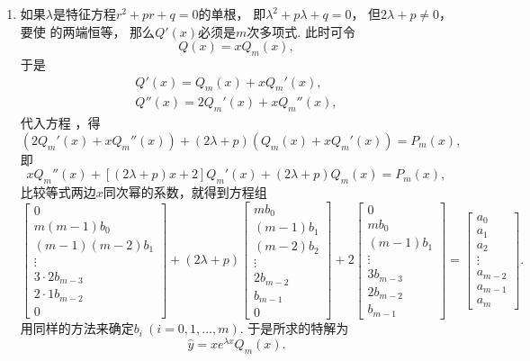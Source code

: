 \begin{enumerate}
	\item 如果\(\lambda\)是特征方程\(r^2+pr+q=0\)的单根，
	即\(\lambda^2+p\lambda+q=0\)，
	但\(2\lambda+p\neq0\)，
	要使  的两端恒等，
	那么\(Q'(x)\)必须是\(m\)次多项式.
	此时可令\[
		Q(x) = x Q_m(x),
	\]
	于是\begin{gather*}
		Q'(x) = Q_m(x) + x Q_m'(x), \\
		Q''(x) = 2 Q_m'(x) + x Q_m''(x),
	\end{gather*}
	代入方程 ，得\[
		(2 Q_m'(x) + x Q_m''(x))
		+ (2\lambda+p) (Q_m(x) + x Q_m'(x))
		= P_m(x),
	\]
	即\[
		x Q_m''(x) + [(2\lambda+p)x+2] Q_m'(x)
		+ (2\lambda+p) Q_m(x)
		= P_m(x),
	\]
	比较等式两边\(x\)同次幂的系数，就得到方程组\[
		\begin{bmatrix}
			0 \\ m(m-1) b_0 \\ (m-1)(m-2) b_1 \\ \vdots \\
			3\cdot2 b_{m-3} \\ 2\cdot1 b_{m-2} \\ 0
		\end{bmatrix}
		+ (2\lambda+p)
		\begin{bmatrix}
			m b_0 \\ (m-1) b_1 \\ (m-2) b_2 \\ \vdots \\
			2 b_{m-2} \\ b_{m-1} \\ 0
		\end{bmatrix}
		+ 2 \begin{bmatrix}
			0 \\ m b_0 \\ (m-1) b_1 \\ \vdots \\
			3 b_{m-3} \\ 2 b_{m-2} \\ b_{m-1}
		\end{bmatrix}
		= \begin{bmatrix}
			a_0 \\ a_1 \\ a_2 \\ \vdots \\
			a_{m-2} \\ a_{m-1} \\ a_m
		\end{bmatrix}.
	\]
	用同样的方法来确定\(b_i\ (i=0,1,\dotsc,m)\).
	于是所求的特解为\begin{equation}
		\hat{y} = x e^{\lambda x} Q_m(x).
	\end{equation}


\end{enumerate}
